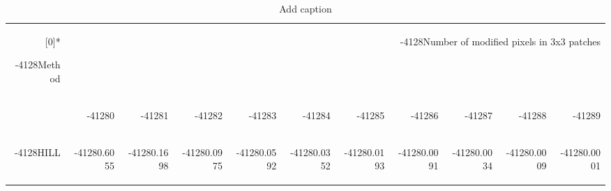 
\begin{table}[htbp]
  \centering
  \caption{Add caption}
    \begin{tabular}{rrrrrrrrrrr}
    \rowcolor[rgb]{ 0,  0,  0} \multirow{2}[0]{*}{\begin{turn}{-4128}Method\end{turn}} & \multicolumn{10}{r}{\begin{turn}{-4128}Number of modified pixels in 3x3 patches\end{turn}} \\
    \rowcolor[rgb]{ 0,  0,  0}       & \begin{turn}{-4128}0\end{turn} & \begin{turn}{-4128}1\end{turn} & \begin{turn}{-4128}2\end{turn} & \begin{turn}{-4128}3\end{turn} & \begin{turn}{-4128}4\end{turn} & \begin{turn}{-4128}5\end{turn} & \begin{turn}{-4128}6\end{turn} & \begin{turn}{-4128}7\end{turn} & \begin{turn}{-4128}8\end{turn} & \begin{turn}{-4128}9\end{turn} \\
    \rowcolor[rgb]{ 0,  0,  0} \begin{turn}{-4128}HILL\end{turn} & \begin{turn}{-4128}0.6055 \end{turn} & \begin{turn}{-4128}0.1698 \end{turn} & \begin{turn}{-4128}0.0975 \end{turn} & \begin{turn}{-4128}0.0592 \end{turn} & \begin{turn}{-4128}0.0352 \end{turn} & \begin{turn}{-4128}0.0193 \end{turn} & \begin{turn}{-4128}0.0091 \end{turn} & \begin{turn}{-4128}0.0034 \end{turn} & \begin{turn}{-4128}0.0009 \end{turn} & \begin{turn}{-4128}0.0001 \end{turn} \\

\end{tabular}
\end{table}
